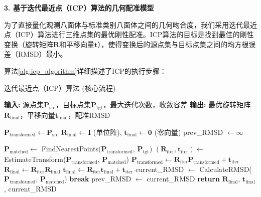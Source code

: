 \textbf{3. 基于迭代最近点（ICP）算法的几何配准模型}

为了直接量化观测八面体与标准类别八面体之间的几何吻合度，我们采用迭代最近点（ICP）算法进行三维点集的最优刚性配准。ICP算法的目标是找到最佳的刚性变换（旋转矩阵$\mathbf{R}$和平移向量$\mathbf{t}$），使得变换后的源点集与目标点集之间的均方根误差（RMSD）最小。

算法\ref{alg:icp_algorithm}详细描述了ICP的执行步骤：
    
    \begin{algorithm}[H]
    \caption{迭代最近点（ICP）算法 (核心流程)}
    \label{alg:icp_algorithm}
    \begin{algorithmic}[1]
        \State \textbf{输入:} 源点集$\mathbf{P}_{\text{src}}$，目标点集$\mathbf{P}_{\text{tgt}}$，最大迭代次数，收敛容差
        \State \textbf{输出:} 最优旋转矩阵$\mathbf{R}_{\text{final}}$，平移向量$\mathbf{t}_{\text{final}}$，配准RMSD
        
        \State $\mathbf{P}_{\text{transformed}} \gets \mathbf{P}_{\text{src}}$
        \State $\mathbf{R}_{\text{final}} \gets \mathbf{I}$ (单位阵), $\mathbf{t}_{\text{final}} \gets \mathbf{0}$ (零向量)
        \State prev\_RMSD $\gets \infty$
        
            \State $\mathbf{P}_{\text{matched}} \gets$ FindNearestPoints($\mathbf{P}_{\text{transformed}}$, $\mathbf{P}_{\text{tgt}}$)
            \State $(\mathbf{R}_{\text{iter}}, \mathbf{t}_{\text{iter}}) \gets$ EstimateTransform($\mathbf{P}_{\text{transformed}}$, $\mathbf{P}_{\text{matched}}$) 
            \State $\mathbf{P}_{\text{transformed}} \gets \mathbf{R}_{\text{iter}}\mathbf{P}_{\text{transformed}} + \mathbf{t}_{\text{iter}}$ 
            \State $\mathbf{R}_{\text{final}} \gets \mathbf{R}_{\text{iter}}\mathbf{R}_{\text{final}}$
            \State $\mathbf{t}_{\text{final}} \gets \mathbf{R}_{\text{iter}}\mathbf{t}_{\text{final}} + \mathbf{t}_{\text{iter}}$
            \State current\_RMSD $\gets$ CalculateRMSD($\mathbf{P}_{\text{transformed}}$, $\mathbf{P}_{\text{matched}}$)
                \State \textbf{break} 
        \EndIf
            \State prev\_RMSD $\gets$ current\_RMSD
        \EndFor
        \State \textbf{return} $\mathbf{R}_{\text{final}}$, $\mathbf{t}_{\text{final}}$, current\_RMSD
    \EndFunction
    \end{algorithmic}
    \end{algorithm}
    
